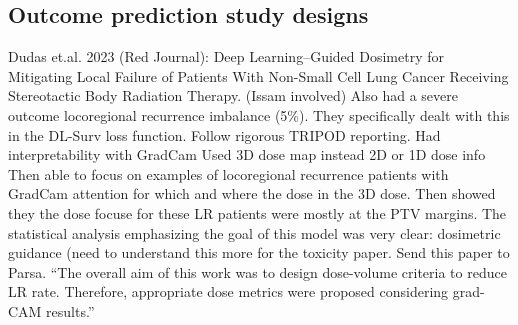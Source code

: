 \documentclass{article}%
\begin{document}
\subsection{}%
\label{subsec:}%

%
\subsection{}%
\label{subsec:}%

%
\subsection{Outcome prediction study designs }%
\label{subsec:Outcomepredictionstudydesigns}%

%
Dudas et.al. 2023 (Red Journal): Deep Learning–Guided Dosimetry for Mitigating Local Failure of Patients With Non{-}Small Cell Lung Cancer Receiving Stereotactic Body Radiation Therapy.  (Issam involved)%
\newline%
\newline%
%
Also had a severe outcome locoregional recurrence imbalance (5\%). They specifically dealt with this in the DL{-}Surv loss function.%
\newline%
\newline%
%
Follow rigorous TRIPOD reporting. %
\newline%
\newline%
%
Had interpretability with GradCam %
\newline%
\newline%
%
Used 3D dose map instead 2D or 1D dose info%
\newline%
\newline%
%
Then able to focus on examples of locoregional recurrence patients with GradCam attention for which and where the dose in the 3D dose. Then showed they the dose focuse for these LR patients were mostly at the PTV margins.%
\newline%
\newline%
%
The statistical analysis emphasizing the goal of this model was very clear: dosimetric guidance (need to understand this more for the toxicity paper. Send this paper to Parsa. %
\newline%
\newline%
%
“The overall aim of this work was to design dose{-}volume criteria to reduce LR rate. Therefore, appropriate dose metrics were proposed considering grad{-}CAM results.”%
\newline%
\newline%
\end{document}
